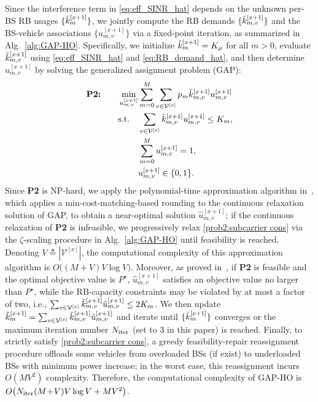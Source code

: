 \documentclass[conference, a4paper]{IEEEtran}
\theoremstyle{remark}
\begin{document}
Since the interference term in \eqref{eq:eff_SINR_hat} depends on the unknown per-BS RB usages $\{\Tilde{k}_{m}^{[x+1]}\}$, we jointly compute the RB demands $\{\Tilde{k}_{m,v}^{[x+1]}\}$ and the BS-vehicle associations $\{u_{m,v}^{[x+1]}\}$ via a fixed-point iteration, as summarized in Alg.~\ref{alg:GAP-HO}. Specifically, we initialize $\Tilde{k}_{m}^{[x+1]}=K_\mu$ for all $m>0$, evaluate $\Tilde{k}_{m,v}^{[x+1]}$ using \eqref{eq:eff_SINR_hat} and \eqref{eq:RB_demand_hat}, and then determine $u_{m,v}^{[x+1]}$ by solving the generalized assignment problem (GAP):
\begin{align}
    \label{prob2}
    \textbf{P2:} \qquad  \min_{u_{m,v}^{[x+1]}} & \sum_{m=0}^M \sum_{v\in\mathcal{V}^{[x]}} p_m  \Tilde{k}_{m,v}^{[x+1]} u_{m,v}^{[x+1]} \\
    \textup{s.t.} \quad 
    & \sum_{v \in \mathcal{V}^{[x]}} \Tilde{k}_{m,v}^{[x+1]} u_{m,v}^{[x+1]} \leq K_m,
    \label{prob2:subcarrier cons}\\
    & \sum_{m=0}^{M} u_{m,v}^{[x+1]} = 1,
    \label{prob2:connection cons} \\
    & u_{m,v}^{[x+1]} \in \{0,1\}.
    \label{prob2:u cons} 
\end{align}
Since \textbf{P2} is NP-hard, we apply the polynomial-time approximation algorithm in~\cite{shmoys1993approximation}, which applies a min-cost-matching-based rounding to the continuous relaxation solution of GAP, to obtain a near-optimal solution $\hat{u}_{m,v}^{[x+1]}$; if the continuous relaxation of \textbf{P2} is infeasible, we progressively relax \eqref{prob2:subcarrier cons} via the $\zeta$-scaling procedure in Alg.~\ref{alg:GAP-HO} until feasibility is reached. Denoting $V\triangleq|\mathcal{V}^{[x]}|$, the computational complexity of this approximation algorithm is $O\big((M\!+\!V)V\log V\big)$. Moreover, as proved in~\cite{shmoys1993approximation}, if \textbf{P2} is feasible and the optimal objective value is $P^{\star}$, $\hat{u}_{m,v}^{[x+1]}$ satisfies an objective value no larger than $P^{\star}$, while the RB-capacity constraints may be violated by at most a factor of two, i.e., $\sum_{v\in\mathcal{V}^{[x]}}\Tilde{k}_{m,v}^{[x+1]}\hat{u}_{m,v}^{[x+1]}\le 2K_m$. We then update $\Tilde{k}_{m}^{[x+1]}=\sum_{v\in\mathcal{V}^{[x]}}\Tilde{k}_{m,v}^{[x+1]}\hat{u}_{m,v}^{[x+1]}$ and iterate until $\{\Tilde{k}_{m}^{[x+1]}\}$ converges or the maximum iteration number $N_{\rm iter}$ (set to $3$ in this paper) is reached. Finally, to strictly satisfy \eqref{prob2:subcarrier cons}, a greedy feasibility-repair reassignment procedure offloads some vehicles from overloaded BSs (if exist) to underloaded BSs with minimum power increase; in the worst case, this reassignment incurs $O(MV^2)$ complexity. Therefore, the computational complexity of GAP-HO is
$O\!\left(N_{\rm iter}(M\!+\!V)V\log V + MV^2\right)$.
\end{document}
